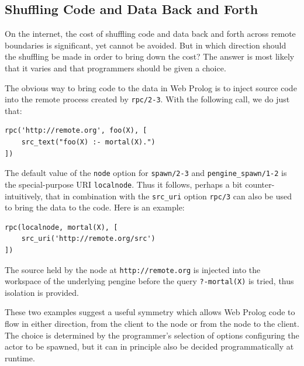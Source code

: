 \documentclass{tlp}
\begin{document}
\subsection{Shuffling Code and Data Back and Forth}

On the internet, the cost of shuffling code and data back and forth across remote boundaries is significant, yet cannot be avoided. But in which direction should the shuffling be made in order to bring down the cost? The answer is most likely that it varies and that programmers should be given a choice.


The obvious way to bring code to the data in Web Prolog is to inject source code into the remote process created by \texttt{rpc/2-3}. With the following call, we do just that:

\begin{lstlisting}
rpc('http://remote.org', foo(X), [
    src_text("foo(X) :- mortal(X).")
])
\end{lstlisting}

\noindent The default value of the \texttt{node} option for \texttt{spawn/2-3} and \texttt{pengine\_spawn/1-2} is the special-purpose URI \texttt{localnode}. Thus it follows, perhaps a bit counter-intuitively, that in combination with the \texttt{src\_uri} option \texttt{rpc/3} can also be used to bring the data to the code. Here is an example:


\begin{lstlisting}
rpc(localnode, mortal(X), [
    src_uri('http://remote.org/src')
])
\end{lstlisting}

\noindent The source held by the node at \texttt{http://remote.org} is injected into the workspace of the underlying pengine before the query \texttt{?-mortal(X)} is tried, thus isolation is provided.

These two examples suggest a useful symmetry which allows Web Prolog code to flow in either direction, from the client to the node or from the node to the client. The choice is determined by the programmer's selection of options configuring the actor to be spawned, but it can in principle also be decided programmatically at runtime.
\end{document}
